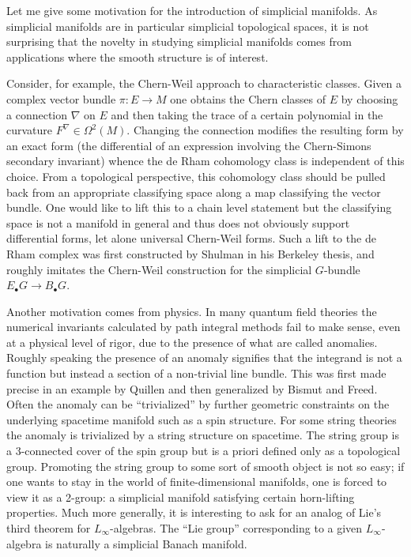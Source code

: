\documentclass{amsart}
\begin{document}
Let me give some motivation for the introduction of simplicial manifolds.
As simplicial manifolds are in particular simplicial topological spaces, it 
is not surprising that the novelty in studying simplicial manifolds comes from 
applications where the smooth structure is of interest.

Consider, for example, the Chern-Weil approach to characteristic classes. Given 
a complex vector bundle $\pi: E\to M$ one obtains the Chern classes of $E$ by 
choosing a connection $\nabla$ on $E$ and then taking the trace of a certain 
polynomial in the curvature $F^\nabla\in\Omega^2(M)$. Changing the connection 
modifies the resulting form by an exact form (the differential of an expression 
involving the Chern-Simons secondary invariant) whence the de Rham cohomology 
class is independent of this choice. From a topological perspective, this 
cohomology class should be pulled back from an appropriate classifying space 
along a map classifying the vector bundle. One would like to lift this to
a chain level statement but the classifying space is not a manifold in general
and thus does not obviously support differential forms, let alone universal 
Chern-Weil forms. Such a lift to the de Rham complex was first constructed by 
Shulman in his Berkeley thesis, and roughly imitates the Chern-Weil construction 
for the simplicial $G$-bundle $E_\bullet G\to B_\bullet G$.

Another motivation comes from physics. In many quantum field theories the 
numerical invariants calculated by path integral methods fail to make sense, 
even at a physical level of rigor, due to the presence of what are called 
anomalies. Roughly speaking the presence of an anomaly signifies that the 
integrand is not a function but instead a section of a non-trivial line bundle. 
This was first made precise in an example by Quillen and then generalized by
Bismut and Freed. Often the anomaly can be ``trivialized'' by further geometric 
constraints on the underlying spacetime manifold such as a spin structure.
For some string theories the anomaly is trivialized by a string structure on 
spacetime. The string group is a 3-connected cover of the spin group
but is a priori defined only as a topological group. Promoting the string 
group to some sort of smooth object is not so easy; if one wants to stay in the 
world of finite-dimensional manifolds, one is forced to view it as a 2-group: a 
simplicial manifold satisfying certain horn-lifting properties. Much more 
generally, it is interesting to ask for an analog of Lie's third theorem for 
$L_\infty$-algebras. The ``Lie group'' corresponding to a given 
$L_\infty$-algebra is naturally a simplicial Banach manifold.
\end{document}
